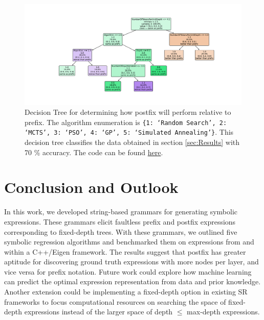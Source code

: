 \documentclass[runningheads]{llncs}
\begin{document}
\begin{figure}
    \centering
    \includegraphics[width=\linewidth]{PrefixPostfixDecisionTree.pdf}
    \caption{Decision Tree for determining how postfix will perform relative to prefix. The algorithm enumeration is \texttt{\{1: `Random Search', 2: `MCTS', 3: `PSO', 4: `GP', 5: `Simulated Annealing'\}}. This decision tree classifies the data obtained in section \ref{sec:Results} with 70 \% accuracy. The code can be found \href{https://github.com/edfink234/Alpha-Zero-Symbolic-Regression/blob/0b5b6d0b56c2d108dda023a337edeb1084436da7/PrefixPostfixDecisionTree.py}{here}. } 
    \label{fig:PrefixPostfixDecisionTree}
\end{figure}

\section{Conclusion and Outlook}
In this work, we developed string-based grammars for generating symbolic expressions. These grammars elicit faultless prefix and postfix expressions corresponding to fixed-depth trees. With these grammars, we outlined five symbolic regression algorithms and benchmarked them on expressions from \cite{hemberg2008pre} and \cite{udrescu2020ai} within a C++/Eigen framework. The results suggest that postfix has greater aptitude for discovering ground truth expressions with more nodes per layer, and vice versa for prefix notation. Future work could explore how machine learning can predict the optimal expression representation from data and prior knowledge. Another extension could be implementing a fixed-depth option in existing SR frameworks to focus computational resources on searching the space of fixed-depth expressions instead of the larger space of depth $\leq$ max-depth expressions. 




\end{document}
